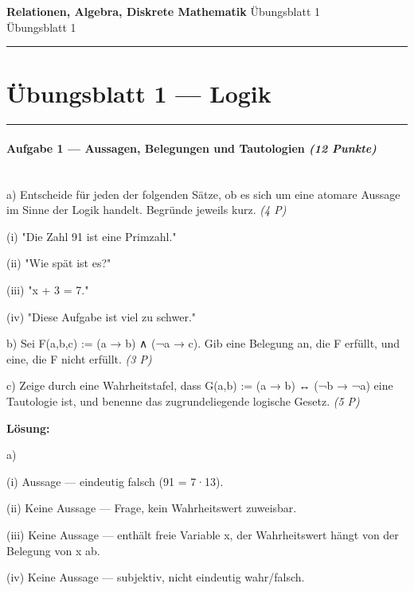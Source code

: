 \documentclass[11pt, a4paper]{article}
\providecommand{\nichttitle}{Übungsblatt}
\providecommand{\nichtsubtitle}{}
\renewcommand{\nichttitle}{Relationen, Algebra, Diskrete Mathematik}
\renewcommand{\nichtsubtitle}{Übungsblatt 1}
\begin{document}
\begin{center}
{\Large\bfseries\color{accent}\nichttitle}
\ifx\nichtsubtitle\empty\else
  \\[2pt]{\normalsize\color{accent!80!black}\nichtsubtitle}
\fi
\\[2pt]
\color{accent}\rule{0.4\linewidth}{0.8pt}\color{black}
\end{center}
\vspace{4pt}


\section{Übungsblatt 1 — Logik}


\noindent\textcolor{rulegray}{\rule{\linewidth}{0.4pt}}


\paragraph{Aufgabe 1 — Aussagen, Belegungen und Tautologien \textit{(12 Punkte)}}\mbox{}\\[2pt]

a) Entscheide für jeden der folgenden Sätze, ob es sich um eine atomare Aussage im Sinne der Logik handelt. Begründe jeweils kurz. \textit{(4 P)}


(i) "Die Zahl 91 ist eine Primzahl."

(ii) "Wie spät ist es?"

(iii) "x + 3 = 7."

(iv) "Diese Aufgabe ist viel zu schwer."


b) Sei F(a,b,c) := (a → b) ∧ (¬a → c). Gib eine Belegung an, die F erfüllt, und eine, die F nicht erfüllt. \textit{(3 P)}


c) Zeige durch eine Wahrheitstafel, dass G(a,b) := (a → b) ↔ (¬b → ¬a) eine Tautologie ist, und benenne das zugrundeliegende logische Gesetz. \textit{(5 P)}


\textbf{Lösung:}


a)

(i) Aussage — eindeutig falsch (91 = 7·13).

(ii) Keine Aussage — Frage, kein Wahrheitswert zuweisbar.

(iii) Keine Aussage — enthält freie Variable x, der Wahrheitswert hängt von der Belegung von x ab.

(iv) Keine Aussage — subjektiv, nicht eindeutig wahr/falsch.
\end{document}
